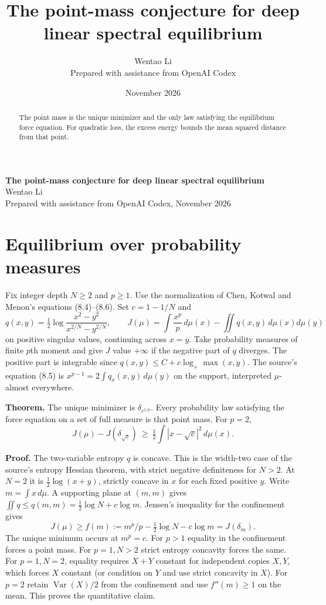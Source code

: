 \documentclass[10pt]{article}
\title{The point-mass conjecture for deep linear spectral equilibrium}
\author{Wentao Li\\{\small Prepared with assistance from OpenAI Codex}}
\date{November 2026}
\begin{document}
\begin{center}{\Large\bfseries The point-mass conjecture for deep linear spectral equilibrium}\\[3pt]Wentao Li\\{\small Prepared with assistance from OpenAI Codex, November 2026}\end{center}
\begin{abstract}
The point mass is the unique minimizer and the only law satisfying the equilibrium force equation. For quadratic loss, the excess energy bounds the mean squared distance from that point.
\end{abstract}
\section*{Equilibrium over probability measures}
Fix integer depth $N\ge2$ and $p\ge1$. Use the normalization of Chen, Kotwal and Menon's equations (8.4)--(8.6). Set $c=1-1/N$ and
\[
 q(x,y)=\tfrac12\log\frac{x^2-y^2}{x^{2/N}-y^{2/N}},\qquad
 J(\mu)=\int \frac{x^p}{p}\,d\mu(x)-\iint q(x,y)\,d\mu(x)d\mu(y)
\]
on positive singular values, continuing across $x=y$. Take probability measures of finite $p$th moment and give $J$ value $+\infty$ if the negative part of $q$ diverges. The positive part is integrable since $q(x,y)\le C+c\log_+\max(x,y)$. The source's equation (8.5) is $x^{p-1}=2\int q_x(x,y)\,d\mu(y)$ on the support, interpreted $\mu$-almost everywhere.

\textbf{Theorem.} The unique minimizer is $\delta_{c^{1/p}}$. Every probability law satisfying the force equation on a set of full measure is that point mass. For $p=2$,
\[
 J(\mu)-J(\delta_{\sqrt c})\ \ge\ \tfrac12\int|x-\sqrt c|^2\,d\mu(x).
\]

\textbf{Proof.} The two-variable entropy $q$ is concave. This is the width-two case of the source's entropy Hessian theorem, with strict negative definiteness for $N>2$. At $N=2$ it is $\tfrac12\log(x+y)$, strictly concave in $x$ for each fixed positive $y$. Write $m=\int x\,d\mu$. A supporting plane at $(m,m)$ gives $\iint q\le q(m,m)=\tfrac12\log N+c\log m$. Jensen's inequality for the confinement gives
\[
 J(\mu)\ge f(m):=m^p/p-\tfrac12\log N-c\log m=J(\delta_m).
\]
The unique minimum occurs at $m^p=c$. For $p>1$ equality in the confinement forces a point mass. For $p=1,N>2$ strict entropy concavity forces the same. For $p=1,N=2$, equality requires $X+Y$ constant for independent copies $X,Y$, which forces $X$ constant (or condition on $Y$ and use strict concavity in $X$). For $p=2$ retain $\operatorname{Var}(X)/2$ from the confinement and use $f''(m)\ge1$ on the mean. This proves the quantitative claim.
\end{document}
